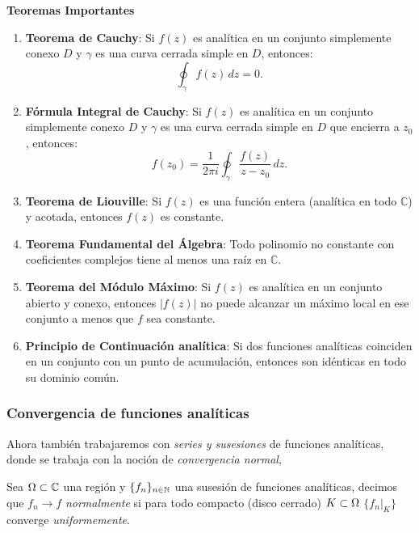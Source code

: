 \documentclass[main.tex]{subfiles}
\begin{document}
\noindent\textbf{Teoremas Importantes}

\begin{enumerate}
\item \textbf{Teorema de Cauchy}:
Si \(f(z)\) es analítica en un conjunto simplemente conexo \(D\) y \(\gamma\) es una curva cerrada simple en \(D\), entonces:
\[
\oint_\gamma f(z) \, dz = 0.
\]

\item \textbf{Fórmula Integral de Cauchy}:
Si \(f(z)\) es analítica en un conjunto simplemente conexo \(D\) y \(\gamma\) es una curva cerrada simple en \(D\) que encierra a \(z_0\), entonces:
\[
f(z_0) = \frac{1}{2\pi i} \oint_\gamma \frac{f(z)}{z - z_0} \, dz.
\]

\item \textbf{Teorema de Liouville}:
Si \(f(z)\) es una función entera (analítica en todo \(\mathbb{C}\)) y acotada, entonces \(f(z)\) es constante.

\item \textbf{Teorema Fundamental del Álgebra}:
Todo polinomio no constante con coeficientes complejos tiene al menos una raíz en \(\mathbb{C}\).

\item \textbf{Teorema del Módulo Máximo}:
Si \(f(z)\) es analítica en un conjunto abierto y conexo, entonces \(|f(z)|\) no puede alcanzar un máximo local en ese conjunto a menos que \(f\) sea constante.

\item \textbf{Principio de Continuación analítica}:
Si dos funciones analíticas coinciden en un conjunto con un punto de acumulación, entonces son idénticas en todo su dominio común.
\end{enumerate}
\subsubsection{Convergencia de funciones analíticas}
\noindent Ahora también trabajaremos con \emph{series y susesiones} de funciones analíticas, donde se trabaja con la noción de \emph{convergencia normal},
\begin{def.}
Sea \(\Omega\subset\mathbb C \) una región y \(\{f_n\}_{n\in \mathbb N }\) una susesión de funciones analíticas, decimos que \(f_n\to f\) \emph{normalmente} si para todo compacto (disco cerrado) \(K\subset\Omega\)
\(\{f_n|_{K}\}\) converge \emph{uniformemente}.
\end{def.}

\end{document}
